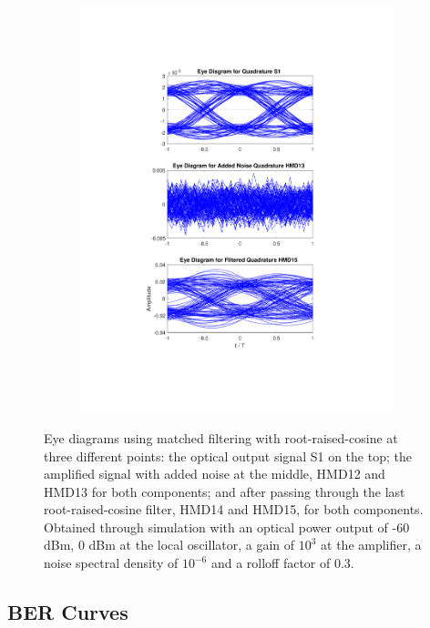 \begin{figure}[H]
\begin{subfigure}{.45\textwidth}
		\includegraphics[clip, trim=5cm 4cm 5cm 4cm, width=\textwidth]{./sdf/m_qam_system/figures/eyes/q_p_60_03.pdf}
	\end{subfigure}
	
	\caption{Eye diagrams using matched filtering with root-raised-cosine
		at three different points: the optical output signal S1 on the top; the
		amplified signal with added noise at the middle, HMD12 and HMD13 for both
		components; and after passing through the last root-raised-cosine filter, HMD14
		and HMD15, for both components. Obtained through simulation with an optical
		power output of -60 dBm, 0 dBm at the local oscillator, a gain of $10^3$ at the
		amplifier, a noise spectral density of $10^{-6}$ and a rolloff factor of
		0.3.\label{fig:eyes_n_rc_60_03}} 
\end{figure}



\subsection{BER Curves}

